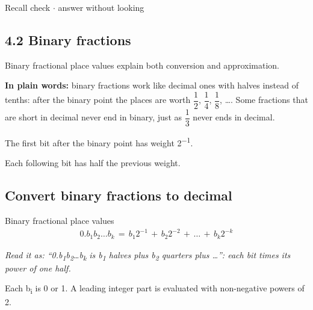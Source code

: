 \documentclass[11pt]{article}
\begin{document}
\begin{keepsection}
\begin{keepsection}
\begin{recallbox}{Recall check \ensuremath{\cdot} answer without looking}
\end{recallbox}
\end{keepsection}
\end{keepsection}

\begin{keepsection}
\section{4.2 Binary fractions}

Binary fractional place values explain both conversion and approximation.

\begin{plainbox}\textbf{In plain words:} binary fractions work like decimal ones with halves instead of tenths: after the binary point the places are worth {\small\ensuremath{\dfrac{1}{2}}}, {\small\ensuremath{\dfrac{1}{4}}}, {\small\ensuremath{\dfrac{1}{8}}}, …. Some fractions that are short in decimal never end in binary, just as {\small\ensuremath{\dfrac{1}{3}}} never ends in decimal.\end{plainbox}

The first bit after the binary point has weight 2\textsuperscript{\ensuremath{-}1}.

Each following bit has half the previous weight.

\begin{keepsection}
\subsection{Convert binary fractions to decimal}

\begin{equationcard}{Binary fractional place values}
\[ \begin{gathered} 0.{b}_{1}{b}_{2}…{b}_{{k}}\, =\, {b}_{1}2^{-1}\, +\, {b}_{2}2^{-2}\, +\, …\, +\, {b}_{{k}}2^{-{k}} \end{gathered} \]
{\small \emph{Read it as: “0.b\textsubscript{1}b\textsubscript{2}…b\textsubscript{k} is b\textsubscript{1} halves plus b\textsubscript{2} quarters plus …”: each bit times its power of one half.}\par Each b\textsubscript{i} is 0 or 1. A leading integer part is evaluated with non-negative powers of 2.}
\end{equationcard}


\end{keepsection}
\end{keepsection}
\end{document}
